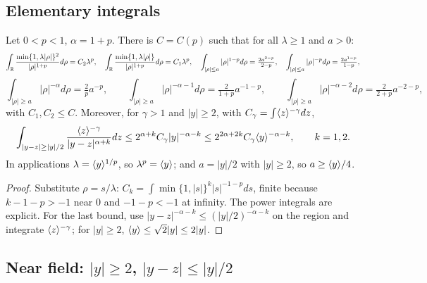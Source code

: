 \subsection{Elementary integrals}

\begin{lemma}
  \label{lem:c10_elementary_integrals}
  Let $0<p<1$, $\alpha=1+p$. There is $C=C(p)$ such that for all $\lambda\ge1$ and $a>0$:
  \[
    \int_{\mathbb{R}}\frac{\min\{1,\lambda|\rho|\}^2}{|\rho|^{1+p}}d\rho=C_2\lambda^p,\quad
    \int_{\mathbb{R}}\frac{\min\{1,\lambda|\rho|\}}{|\rho|^{1+p}}d\rho=C_1\lambda^p,\quad
    \int_{|\rho|\le a}|\rho|^{1-p}d\rho=\tfrac{2a^{2-p}}{2-p},\quad
    \int_{|\rho|\le a}|\rho|^{-p}d\rho=\tfrac{2a^{1-p}}{1-p},
  \]
  \[
    \int_{|\rho|\ge a}|\rho|^{-\alpha}d\rho=\tfrac{2}{p}a^{-p},\qquad
    \int_{|\rho|\ge a}|\rho|^{-\alpha-1}d\rho=\tfrac{2}{1+p}a^{-1-p},\qquad
    \int_{|\rho|\ge a}|\rho|^{-\alpha-2}d\rho=\tfrac{2}{2+p}a^{-2-p},
  \]
  with $C_1,C_2\le C$. Moreover, for $\gamma>1$ and $|y|\ge2$, with $C_\gamma=\int\langle z \rangle^{-\gamma}dz$,
  \[
    \int_{|y-z|\ge|y|/2}\frac{\langle z \rangle^{-\gamma}}{|y-z|^{\alpha+k}}dz\le 2^{\alpha+k}C_\gamma|y|^{-\alpha-k}
    \le 2^{2\alpha+2k}C_\gamma\langle y \rangle^{-\alpha-k},\qquad k=1,2.
  \]
  In applications $\lambda=\langle y \rangle^{1/p}$, so $\lambda^p=\langle y \rangle$; and $a=|y|/2$ with $|y|\ge2$, so
  $a\ge\langle y \rangle/4$.
\end{lemma}
\begin{proof}
  Substitute $\rho=s/\lambda$: $C_k=\int\min\{1,|s|\}^k|s|^{-1-p}ds$, finite because $k-1-p>-1$ near $0$
  and $-1-p<-1$ at infinity. The power integrals are explicit. For the last bound, use
  $|y-z|^{-\alpha-k}\le(|y|/2)^{-\alpha-k}$ on the region and integrate $\langle z \rangle^{-\gamma}$; for $|y|\ge2$,
  $\langle y \rangle\le\sqrt2|y|\le 2|y|$.
\end{proof}

\subsection{Near field: $|y|\ge2$, $|y-z|\le|y|/2$}

